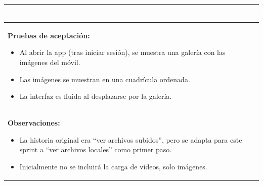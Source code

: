 \begin{table}[H]
\begin{center}
\begin{tabularx}{\textwidth}{|l|X|l|}
{\begin{minipage}{\textwidth}
\begin{tabular}{|l|p{8cm}|r|}
                        \hline
                    \end{tabular}
                    \vspace{0.5em}
                \end{minipage}
            } \\
            \hline
            \multicolumn{3}{|p{\textwidth}|}{
                \textbf{Pruebas de aceptación:}
                \begin{itemize}
                    \item Al abrir la app (tras iniciar sesión), se muestra una galería con las imágenes del móvil.
                    \item Las imágenes se muestran en una cuadrícula ordenada.
                    \item La interfaz es fluida al desplazarse por la galería.
                \end{itemize}
            }\\
            \hline
            \multicolumn{3}{|p{\textwidth}|}{
                \textbf{Observaciones:}
                \begin{itemize}
                    \item La historia original era ``ver archivos subidos'', pero se adapta para este sprint a ``ver archivos locales'' como primer paso.
                    \item Inicialmente no se incluirá la carga de vídeos, solo imágenes.
                \end{itemize}
            }\\
            \hline
        \end{tabularx}
    \end{center}
\end{table}

